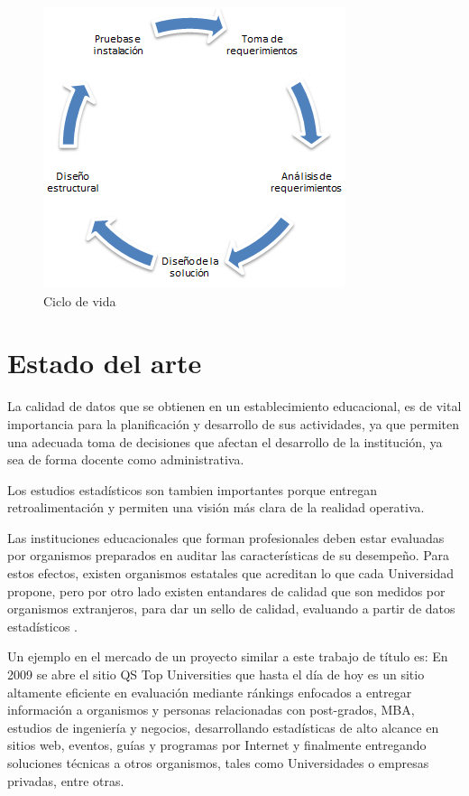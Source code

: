 \documentclass[a4paper,12pt,openany,oneside]{book}
\begin{document}
\begin{figure}[!hbp]
\begin{center}
\includegraphics[scale=0.6,angle=0]{images/cicloMini.PNG}
\caption{Ciclo de vida}
\label{Organigrama de rectoria}
\end{center}
\end{figure}
\section{Estado del arte}
La calidad de datos que se obtienen en un establecimiento educacional, es de vital importancia para la planificación y desarrollo de sus actividades, ya que permiten una adecuada toma de decisiones que afectan el desarrollo de la institución, ya sea de forma docente como administrativa. 

Los estudios estadísticos son tambien importantes porque entregan retroalimentación y permiten una visión más clara de la realidad operativa.

Las instituciones educacionales que forman profesionales deben estar evaluadas por organismos preparados en auditar las características de su desempeño. Para estos efectos, existen organismos estatales que acreditan lo que cada Universidad propone, pero por otro lado existen entandares de calidad que son medidos por organismos extranjeros, para dar un sello de calidad, evaluando a partir de datos estadísticos  \cite{data1}.

Un ejemplo en el mercado de un proyecto similar a este trabajo de título es: En 2009 se abre el sitio QS Top Universities que hasta el día de hoy es un sitio altamente eficiente en evaluación mediante ránkings enfocados a entregar información a organismos y personas relacionadas con post-grados, MBA, estudios de ingeniería y negocios, desarrollando estadísticas de alto alcance en sitios web, eventos, guías y programas por Internet y finalmente entregando soluciones técnicas a otros organismos, tales como Universidades o empresas privadas, entre otras.
\end{document}
